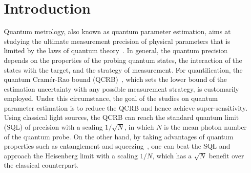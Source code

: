 \documentclass[aps,pra,reprint,showpacs,groupedaddress]{revtex4-1}
\begin{document}
\section{Introduction}
Quantum metrology, also known as quantum parameter estimation, aims at studying the ultimate measurement precision of physical parameters that is limited by the laws of quantum theory~\cite{Helstrom1976_Book_quantumdetectionandestimationtheory,Giovannetti2004_entanglement/squeezing_Heisenberg_single}.  In general, the quantum precision depends on the properties of the probing quantum states, the interaction of the states with the target, and the strategy of measurement.  For quantification, the quantum Cram\'er-Rao bound (QCRB)~\cite{Helstrom1976_Book_quantumdetectionandestimationtheory,Braunstein1994_statisticalDistance}, which sets the lower bound of the estimation uncertainty with any possible measurement strategy, is customarily employed. Under this circumstance, the goal of the studies on quantum parameter estimation is to reduce the QCRB and hence achieve super-sensitivity. Using classical light sources, the QCRB can reach the standard quantum limit (SQL) of precision with a scaling $1/\sqrt{N}$, in which $N$ is the mean photon number of the quantum probe.  On the other hand, by taking advantages of quantum properties such as entanglement and squeezing~\cite{Giovannetti2004_entanglement/squeezing_Heisenberg_single}, one can beat the SQL and approach the Heisenberg limit with a scaling $1/N$, which has a $\sqrt{N}$ benefit over the classical counterpart.
\end{document}

